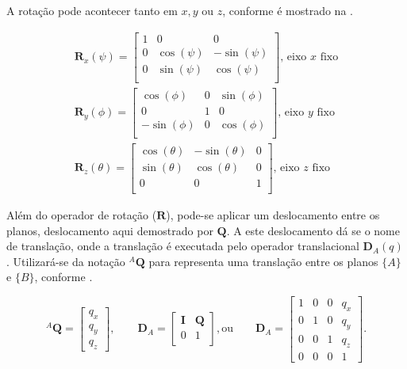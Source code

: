 A rotação pode acontecer tanto em $x, y$ ou $z$, conforme é mostrado na .

\begin{equation}
\begin{split}
    \mathbf{R}_x(\psi) =
    \begin{bmatrix}
        1 & 0            & 0             \\
        0 & \cos(\psi) & -\sin(\psi) \\
        0 & \sin(\psi) & \cos(\psi)  \\
    \end{bmatrix} \text{, eixo $x$ fixo}
    \\    
    \mathbf{R}_y(\phi) =
    \begin{bmatrix}
        \cos(\phi)  & 0 & \sin(\phi) \\
        0             & 1 & 0            \\
        -\sin(\phi) & 0 & \cos(\phi) \\
    \end{bmatrix} \text{, eixo $y$ fixo}
    \\
    \mathbf{R}_z(\theta) =
    \begin{bmatrix}
        \cos(\theta) & -\sin(\theta) & 0 \\
        \sin(\theta) & \cos(\theta) & 0 \\
        0            & 0            & 1 \\
    \end{bmatrix} \text{, eixo $z$ fixo}
\end{split}
\label{eq:rotxyz}
\end{equation}

Além do operador de rotação ($\mathbf{R}$), pode-se aplicar um deslocamento entre os planos, deslocamento aqui demostrado por $\mathbf{Q}$. A este deslocamento dá se o nome de translação, onde a translação é executada pelo operador translacional $\mathbf{D}_A(q)$. Utilizará-se da notação ${}^A\mathbf{Q}$ para representa uma translação entre os planos $\{A\}$ e $\{B\}$, conforme .

\begin{equation}\label{eq:cine4}
    {}^A\mathbf{Q} =
    \begin{bmatrix}
    q_x\\ q_y \\ q_z
    \end{bmatrix}, \qquad
    \mathbf{D}_A = 
    \begin{bmatrix}
    \mathbf{I} & \mathbf{Q}\\
    0 & 1\\
    \end{bmatrix}, \mathrm{ou} \qquad
    \mathbf{D}_A = 
    \begin{bmatrix}
    1 & 0 & 0 & q_x\\
    0 & 1 & 0 & q_y\\
    0 & 0 & 1 & q_z\\
    0 & 0 & 0 & 1
    \end{bmatrix}.
\end{equation}
    
